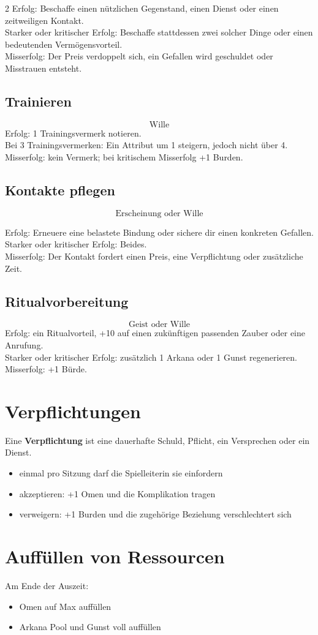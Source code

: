 \begin{multicols*}{2}
Erfolg: Beschaffe einen nützlichen Gegenstand, einen Dienst oder einen zeitweiligen Kontakt.\\
Starker oder kritischer Erfolg: Beschaffe stattdessen zwei solcher Dinge oder einen bedeutenden Vermögensvorteil.\\
Misserfolg: Der Preis verdoppelt sich, ein Gefallen wird geschuldet oder Misstrauen entsteht.

\subsection{Trainieren}
\[
\text{Wille}
\]
Erfolg: 1 Trainingsvermerk notieren.\\
Bei 3 Trainingsvermerken: Ein Attribut um 1 steigern, jedoch nicht über 4.\\
Misserfolg: kein Vermerk; bei kritischem Misserfolg +1 Burden.

\subsection{Kontakte pflegen}
\[
\text{Erscheinung oder Wille}
\]

Erfolg: Erneuere eine belastete Bindung oder sichere dir einen konkreten Gefallen.\\
Starker oder kritischer Erfolg: Beides.\\
Misserfolg: Der Kontakt fordert einen Preis, eine Verpflichtung oder zusätzliche Zeit.

\subsection{Ritualvorbereitung}
\[
\text{Geist oder Wille}
\]
Erfolg: ein Ritualvorteil, +10 auf einen zukünftigen passenden Zauber oder eine Anrufung.\\
Starker oder kritischer Erfolg: zusätzlich 1 Arkana oder 1 Gunst regenerieren.\\
Misserfolg: +1 Bürde.

\section{Verpflichtungen}
Eine \textbf{Verpflichtung} ist eine dauerhafte Schuld, Pflicht, ein Versprechen oder ein Dienst.
\begin{itemize}[leftmargin=*]
\item einmal pro Sitzung darf die Spielleiterin sie einfordern
\item akzeptieren: +1 Omen und die Komplikation tragen
\item verweigern: +1 Burden und die zugehörige Beziehung verschlechtert sich
\end{itemize}

\section{Auffüllen von Ressourcen}
Am Ende der Auszeit:
\begin{itemize}[leftmargin=*]
\item Omen auf Max auffüllen
\item Arkana Pool und Gunst voll auffüllen
\end{itemize}
\end{multicols*}
